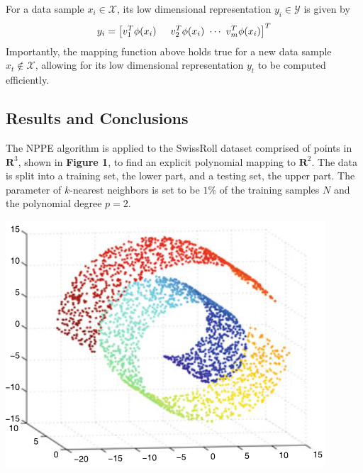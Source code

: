 \documentclass[a0,landscape]{a0poster}
\begin{document}
\begin{multicols}{4}
For a data sample $x_i \in \mathcal{X}$, its low dimensional representation $y_i \in \mathcal{Y}$ is given by
\begin{equation}
y_i = \left[ v_1^T\phi(x_i) \hspace{0.5cm} v_2^T\phi(x_i) \text{ }\cdots\text{ } v_m^T\phi(x_i)  \right]^T
\end{equation}
Importantly, the mapping function above holds true for a new data sample $x_t \notin \mathcal{X}$, allowing for its low dimensional representation $y_t$ to be computed efficiently. 
\begin{tcolorbox}[colback=white,colframe=black]
    \color{DarkSlateGray}
    \begin{center}\section*{Results and Conclusions}\end{center}
\end{tcolorbox}
\color{Black}

The NPPE algorithm is applied to the SwissRoll dataset comprised of points in $\mathbf{R}^3$, shown in \textbf{Figure 1}, to find an explicit polynomial mapping to $\mathbf{R}^2$. The data is split into a training set, the lower part, and a testing set, the upper part. The parameter of $k$-nearest neighbors is set to be $1\%$ of the training samples $N$ and the polynomial degree $p=2$.     

\begin{center}\vspace{1cm}
\includegraphics[width=0.8\linewidth]{figures/hd.png}
\end{center}\vspace{1cm}


\end{multicols}
\end{document}
